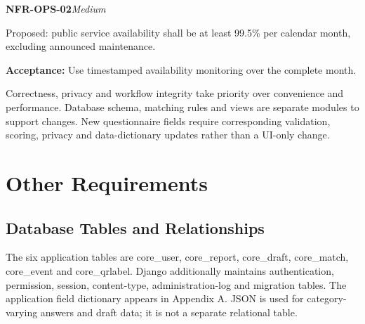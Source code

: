 \documentclass[12pt,a4paper,oneside]{report}
\begin{document}
\noindent\begin{minipage}{\linewidth}\textbf{NFR-OPS-02}\hfill\textit{Medium}\par\nopagebreak

Proposed: public service availability shall be at least 99.5\% per calendar month, excluding announced maintenance.

{\color{muted}\textbf{Acceptance:} Use timestamped availability monitoring over the complete month.\par}\end{minipage}\par\vspace{5pt}

Correctness, privacy and workflow integrity take priority over convenience and performance. Database schema, matching rules and views are separate modules to support changes. New questionnaire fields require corresponding validation, scoring, privacy and data-dictionary updates rather than a UI-only change.

\chapter{Other Requirements}


\section{Database Tables and Relationships}

The six application tables are core\_user, core\_report, core\_draft, core\_match, core\_event and core\_qrlabel. Django additionally maintains authentication, permission, session, content-type, administration-log and migration tables. The application field dictionary appears in Appendix A. JSON is used for category-varying answers and draft data; it is not a separate relational table.
\end{document}
